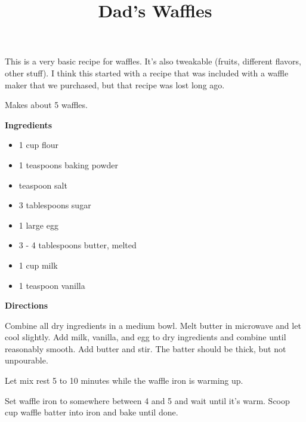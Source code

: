 \documentclass{article}
\title{Dad's Waffles}
\begin{document}
This is a very basic recipe for waffles. It's also tweakable (fruits, different
flavors, other stuff). I think this started with a recipe that was included
with a waffle maker that we purchased, but that recipe was lost long ago.

Makes about 5 waffles.

\bigskip
\bigskip

\textbf{Ingredients}

\begin{itemize}
    \item 1 cup flour
    \item 1 teaspoons baking powder
    \item {} teaspoon salt
    \item 3 tablespoons sugar
    \item 1 large egg
    \item 3 - 4 tablespoons butter, melted
    \item 1 cup milk
    \item 1 teaspoon vanilla
\end{itemize}

\bigskip

\textbf{Directions}

Combine all dry ingredients in a medium bowl. Melt butter in
microwave and let cool slightly. Add milk, vanilla, and egg to
dry ingredients and combine until reasonably smooth. Add butter and stir.
The batter should be thick, but not unpourable.

Let mix rest 5 to 10 minutes while the waffle iron is warming up.

Set waffle iron to somewhere between 4 and 5 and wait until it's warm.
Scoop  cup waffle batter into iron and bake until done.

\end{document}
